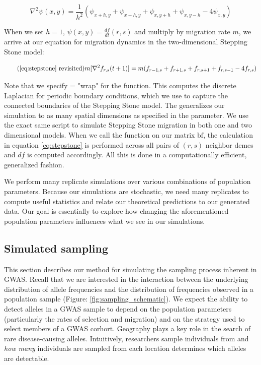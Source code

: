 \begin{equation}
    \nabla^2 \psi(x,y) =  \frac{1}{h^2}(\psi_{x+h,y} + \psi_{x-h,y} + \psi_{x,y+h} + \psi_{x,y-h} - 4\psi_{x,y})
\end{equation}

When we set $h = 1$, $\psi(x,y) = \frac{df}{dt}(r,s)$ and multiply by migration rate $m$, we arrive at our equation for migration dynamics in the two-dimensional Stepping Stone model:

\begin{equation} 
    \tag{\ref{eq:stepstone} revisited}
    m[\nabla^2 f_{r,s}(t+1)] = m(f_{r-1,s} + f_{r+1,s} + f_{r,s+1} + f_{r,s-1} - 4f_{r,s})
\end{equation}


Note that we specify  = "wrap" for the  function. This computes the discrete Laplacian for periodic boundary conditions, which we use to capture the connected boundaries of the Stepping Stone model. The  generalizes our simulation to as many spatial dimensions as specified in the  parameter. We use the exact same script to simulate Stepping Stone migration in both one and two dimensional models. When we call the  function on our matrix $\text{bf}$, the calculation in equation \ref{eq:stepstone} is performed across all pairs of $(r,s)$ neighbor demes and $df$ is computed accordingly. All this is done in a computationally efficient, generalized fashion.


We perform many replicate simulations over various combinations of population parameters. Because our simulations are stochastic, we need many replicates to compute useful statistics and relate our theoretical predictions to our generated data. Our goal is essentially to explore how changing the aforementioned population parameters influences what we see in our simulations. 


\subsection{Simulated sampling}
This section describes our method for simulating the sampling process inherent in GWAS. Recall that we are interested in the interaction between the underlying distribution of allele frequencies and the distribution of frequencies observed in a population sample (Figure: \ref{fig:sampling_schematic}). We expect the ability to detect alleles in a GWAS sample to depend on the population parameters (particularly the rates of selection and migration) and on the strategy used to select members of a GWAS corhort. Geography plays a key role in the search of rare disease-causing alleles. Intuitively,  researchers sample individuals from and \textit{how many} individuals are sampled from each location determines which alleles are detectable.



